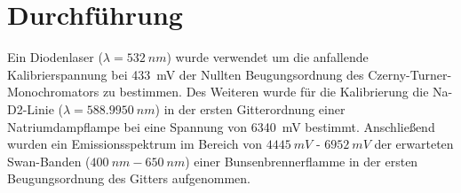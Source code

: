 
 
%
\section{Durchführung}
Ein Diodenlaser ($\lambda=532~\si{nm}$) wurde verwendet um die anfallende Kalibrierspannung bei \SI[mode=math]{433}{mV} der Nullten Beugungsordnung des Czerny-Turner-Monochromators zu bestimmen. Des Weiteren wurde für die Kalibrierung die Na-D2-Linie ($\lambda = 588.9950~\si{nm}$)\cite{} in der ersten Gitterordnung einer Natriumdampflampe bei eine Spannung von \SI[mode=math]{6340}{mV} bestimmt. Anschließend wurden ein Emissionsspektrum im Bereich von $\SI[mode=math]{4445}{mV} \text{~-~} \SI[mode=math]{6952}{mV}$ der erwarteten Swan-Banden ($\SI[mode=math]{400}{nm}- \SI[mode=math]{650}{nm}$) einer Bunsenbrennerflamme in der ersten Beugungsordnung des Gitters aufgenommen.
%